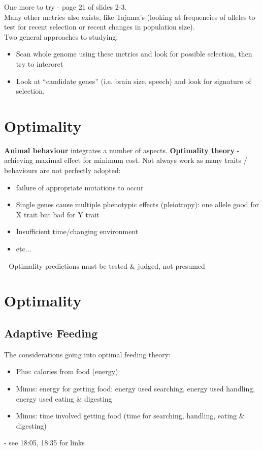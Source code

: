 \documentclass{scrartcl}
\begin{document}
One more to try - page 21 of slides 2-3.\\
Many other metrics also exists, like Tajama's (looking at frequencies of alleles to test for recent selection or recent changes in population size).\\
Two general approaches to studying:
\begin{itemize}
\item Scan whole genome using these metrics and look for possible selection, then try to interoret
\item Look at ``candidate genes'' (i.e. brain size, speech) and look for signature of selection.
\end{itemize}


\section{Optimality}
\label{sec:9-1}

{\bf Animal behaviour} integrates a number of aspects.
{\bf Optimality theory} - achieving maximal effect for minimum cost.
Not always work as many traits / behaviours are not perfectly adopted:
\begin{itemize}
\item failure of appropriate mutations to occur
\item Single genes cause multiple phenotypic effects (pleiotropy): one allele good for X trait but bad for Y trait
\item Insufficient time/changing environment
\item etc...
\end{itemize}
- Optimality predictions must be tested \& judged, not presumed
\section{Optimality}
\label{9-1}

\subsection{Adaptive Feeding}
\label{sec:9-1-0}
The considerations going into optimal feeding theory:
\begin{itemize}
\item Plus: calories from food (energy)
\item Minus: energy for getting food: energy used searching, energy used handling, energy used eating \& digesting
\item Minus: time involved getting food (time for searching, handling, eating \& digesting)
\end{itemize}
- see 18:05, 18:35 for links
\end{document}
